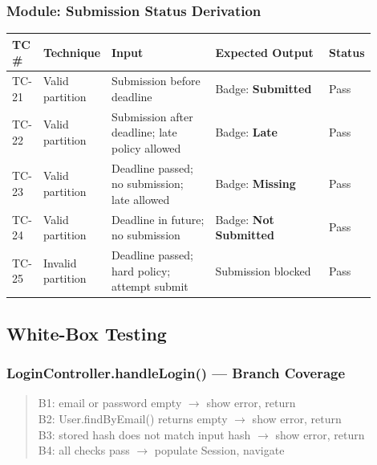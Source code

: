 \documentclass[12pt, a4paper]{article}
\begin{document}
\subsubsection*{Module: Submission Status Derivation}
\begin{center}\small
\begin{tabular}{@{}p{0.06\linewidth}p{0.13\linewidth}p{0.30\linewidth}p{0.33\linewidth}p{0.08\linewidth}@{}}
  \toprule
  \textbf{TC \#} & \textbf{Technique} & \textbf{Input} & \textbf{Expected Output} & \textbf{Status} \\
  \midrule
  TC-21 & Valid partition   & Submission before deadline                        & Badge: \textbf{Submitted}       & \textcolor{success}{Pass} \\
TC-22 & Valid partition   & Submission after deadline; late policy allowed   & Badge: \textbf{Late}            & \textcolor{success}{Pass} \\
  TC-23 & Valid partition   & Deadline passed; no submission; late allowed      & Badge: \textbf{Missing}         & \textcolor{success}{Pass} \\
TC-24 & Valid partition   & Deadline in future; no submission                 & Badge: \textbf{Not Submitted}   & \textcolor{success}{Pass} \\
  TC-25 & Invalid partition & Deadline passed; hard policy; attempt submit      & Submission blocked              & \textcolor{success}{Pass} \\
  \bottomrule
\end{tabular}
\end{center}

\subsection{White-Box Testing}

\subsubsection*{LoginController.handleLogin() --- Branch Coverage}
\begin{quote}\small\ttfamily
B1: email or password empty \hfill $\to$ show error, return\\
B2: User.findByEmail() returns empty \hfill $\to$ show error, return\\
B3: stored hash does not match input hash \hfill $\to$ show error, return\\
B4: all checks pass \hfill $\to$ populate Session, navigate
\end{quote}
\end{document}
